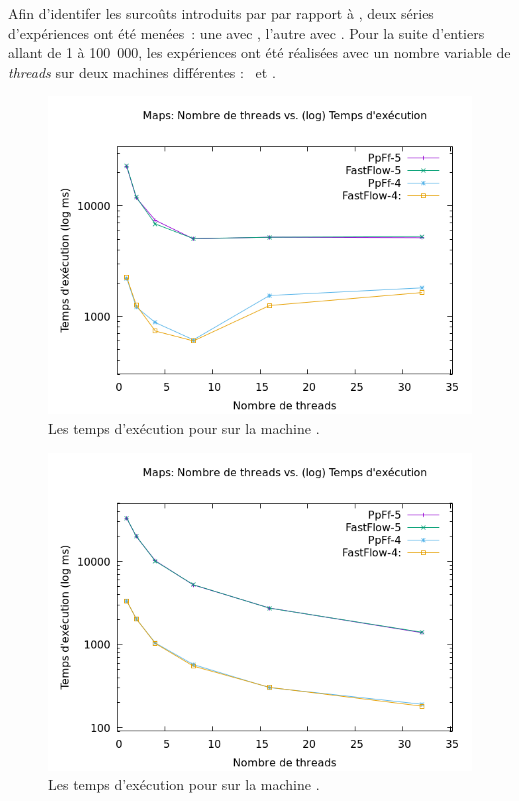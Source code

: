 Afin d'identifer les surco\^uts introduits par \PpFf{} par rapport \`a , deux s\'eries d'exp\'eriences ont \'et\'e men\'ees~: une avec , l'autre avec . Pour la suite d'entiers allant de 1 \`a 100~000, les exp\'eriences ont \'et\'e r\'ealis\'ees avec un nombre variable de \emph{threads} sur deux machines diff\'erentes : \ et .  


\begin{figure}
\centering
     \includegraphics[width=1.0\textwidth]{Figures/graphe_temps_Java_Maps.png}
      \caption{Les temps d'ex\'ecution pour  sur la machine .}
       \label{GrapheTempsMapsJava.fig}
\end{figure}

\begin{figure}
\centering
     \includegraphics[width=1.0\textwidth]{Figures/graphe_temps_Japet_Maps.png}
      \caption{Les temps d'ex\'ecution pour  sur la machine .}
       \label{GrapheTempsMapstJapet.fig}
\end{figure}


